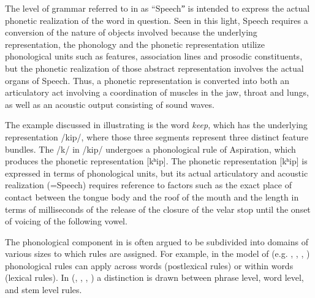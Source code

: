 The level of grammar referred to in  as “Speechˮ is intended to express the actual phonetic realization of the word in question. Seen in this light, Speech requires a conversion of the nature of objects involved because the underlying representation, the phonology and the phonetic representation utilize phonological units such as features, association lines and prosodic constituents, but the phonetic realization of those abstract representation involves the actual organs of Speech. Thus, a phonetic representation is converted into both an articulatory act involving a coordination of muscles in the jaw, throat and lungs, as well as an acoustic output consisting of sound waves.

The example discussed in \citet{HaleReiss2015} illustrating  is the  word \textit{keep}, which has the underlying representation /kip/, where those three segments represent three distinct feature bundles. The /k/ in /kip/ undergoes a phonological rule of Aspiration, which produces the phonetic representation [kʰip]. The phonetic representation [kʰip] is expressed in terms of phonological units, but its actual articulatory and acoustic realization (=Speech) requires reference to factors such as the exact place of contact between the tongue body and the roof of the mouth and the length in terms of milliseconds of the release of the closure of the velar stop until the onset of voicing of the following vowel.

The phonological component in  is often argued to be subdivided into domains of various sizes to which rules are assigned. For example, in the model of  (e.g. \citealt{Kiparsky1982b}, \citealt{KaisseShaw1985}, \citealt{Mohanan1986}, \citealt{HargusKaisse1993}) phonological rules can apply across words (postlexical rules) or within words (lexical rules). In  (\citealt{Kiparsky2000}, \citealt{Rubach2000}, \citealt{KaisseMcMahon2011}, \citealt{Bermúdez-Otero2015}) a distinction is drawn between phrase level, word level, and stem level rules.

